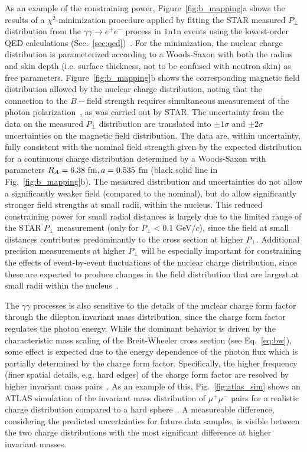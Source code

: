 \documentclass[12pt,epjc3]{svjour3}\sloppy
\begin{document}
As an example of the constraining power, Figure~\ref{fig:b_mapping}a shows the results of a $\chi^2$-minimization procedure applied by fitting the STAR measured $P_\perp$ distribution from the $\gamma\gamma \rightarrow e^+e^-$ process in $1$n$1$n events using the lowest-order QED calculations (Sec.~\ref{sec:qed})~\cite{starcollaborationMeasurementMomentumAngular2021}. For the minimization, the nuclear charge distribution is parameterized according to a Woods-Saxon with both the radius and skin depth (i.e. surface thickness, not to be confused with neutron skin) as free parameters. 
Figure~\ref{fig:b_mapping}b shows the corresponding magnetic field distribution allowed by the nuclear charge distribution, noting that the connection to the $B-$field strength requires simultaneous measurement of the photon polarization~\cite{starcollaborationMeasurementMomentumAngular2021}, as was carried out by STAR. 
The uncertainty from the data on the measured $P_\perp$ distribution are translated into $\pm1\sigma$ and $\pm2\sigma$ uncertainties on the magnetic field distribution. 
The data are, within uncertainty, fully consistent with the nominal field strength given by the expected distribution for a continuous charge distribution determined by a Woods-Saxon with parameters $R_A=6.38\ {\rm fm}, a=0.535$ fm (black solid line in Fig.~\ref{fig:b_mapping}b). 
The measured distribution and uncertainties do not allow a significantly weaker field (compared to the nominal), but do allow significantly stronger field strengths at small radii, within the nucleus. 
This reduced constraining power for small radial distances is largely due to the limited range of the STAR $P_\perp$ measurement (only for $P_\perp < 0.1$ GeV/$c$), since the field at small distances contributes predominantly to the cross section at higher $P_\perp$.
Additional precision measurements at higher $P_\perp$ will be especially important for constraining the effects of event-by-event fluctuations of the nuclear charge distribution, since these are expected to produce changes in the field distribution that are largest at small radii within the nucleus~\cite{skokovEstimateMagneticField2009}. 


The $\gamma\gamma$ processes is also sensitive to the details of the nuclear charge form factor through the dilepton invariant mass distribution, since the charge form factor regulates the photon energy. While the dominant behavior is driven by the characteristic mass scaling of the Breit-Wheeler cross section (see Eq.~\ref{eq:bw}), some effect is expected due to the energy dependence of the photon flux which is partially determined by the charge form factor. Specifically, the higher frequency (finer spatial details, e.g. hard edges) of the charge form factor are resolved by higher invariant mass pairs~\cite{klusek-gawendaExclusiveMuonpairProduction2010}. 
As an example of this, Fig.~\ref{fig:atlas_sim} shows an ATLAS simulation of the invariant mass distribution of $\mu^+\mu^-$ pairs for a realistic charge distribution compared to a hard sphere~\cite{ProspectsMeasurementsPhotonInduced}. A measureable difference, considering the predicted uncertainties for future data samples, is visible between the two charge distributions with the most significant difference at higher invariant masses.
\end{document}
